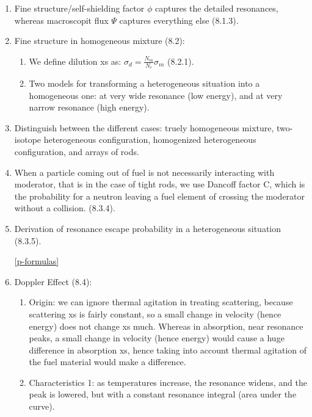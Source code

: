 \documentclass{school-22.211-notes}
\begin{document}
\begin{enumerate}
\item Fine structure/self-shielding factor $\phi$ captures the detailed resonances, whereas macroscopit flux $\Psi$ captures everything else (8.1.3).
\item Fine structure in homogeneous mixture (8.2):
  \begin{enumerate}
    \item We define dilution xs as: $\sigma_d = \frac{N_m}{N_r} \sigma_m$ (8.2.1). 
    \item Two models for transforming a heterogeneous situation into a homogeneous one: 
      at very wide resonance (low energy), and at very narrow resonance (high energy). 
  \end{enumerate}
\item Distinguish between the different cases: truely homogeneous mixture, two-isotope heterogeneous configuration, homogenized heterogeneous configuration, and arrays of rods. 
\item When a particle coming out of fuel is not necessarily interacting with moderator, that is in the case of tight rods, we use Dancoff factor C, which is the probability for a neutron leaving a fuel element of crossing the moderator without a collision. (8.3.4).
\item Derivation of resonance escape probability in a heterogeneous situation (8.3.5). 
\begin{table}
  \begin{tabular}{|c|c|} \hline
    Homogeneous & $\p = \exp\left[ - \frac{N_0 I_{\eff}}{(\xi \Sigma_s)_m  \right]$ \\ \hline
    General & $\p = \exp\left[ - \frac{V_C N_0 I_{\eff}}{\Sum_i (V \xi \Sigma_s)_i  \right]$ \\  \hline
  \end{tabular}
  \caption{Resonance Escape Probability Formulas} \ref{p-formulas}
\end{table}
\item Doppler Effect (8.4):
\begin{enumerate}
\item Origin: we can ignore thermal agitation in treating scattering, because scattering xs is fairly constant, so a small change in velocity (hence energy) does not change xs much. Whereas in absorption, near resonance peaks, a small change in velocity (hence energy) would cause a huge difference in absorption xs, hence taking into account thermal agitation of the fuel material would make a difference. 
\item Characteristics 1: as temperatures increase, the resonance widens, and the peak is lowered, but with a constant resonance integral (area under the curve). 

\end{enumerate}
\end{enumerate}
\end{document}
